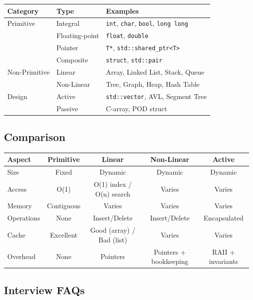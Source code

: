 \begin{center}
\begin{tabular}{lll}
\toprule
Category & Type & Examples \\
\midrule
Primitive & Integral & \texttt{int}, \texttt{char}, \texttt{bool}, \texttt{long long} \\
& Floating-point & \texttt{float}, \texttt{double} \\
& Pointer & \texttt{T*}, \texttt{std::shared\_ptr<T>} \\
& Composite & \texttt{struct}, \texttt{std::pair} \\
\midrule
Non-Primitive & Linear & Array, Linked List, Stack, Queue \\
& Non-Linear & Tree, Graph, Heap, Hash Table \\
\midrule
Design & Active & \texttt{std::vector}, AVL, Segment Tree \\
& Passive & C-array, POD struct \\
\bottomrule
\end{tabular}
\end{center}

\subsection{Comparison}

\begin{center}
\begin{tabular}{lcccc}
\toprule
Aspect & Primitive & Linear & Non-Linear & Active \\
\midrule
Size & Fixed & Dynamic & Dynamic & Dynamic \\
Access & O(1) & O(1) index / O(n) search & Varies & Varies \\
Memory & Contiguous & Varies & Varies & Varies \\
Operations & None & Insert/Delete & Insert/Delete & Encapsulated \\
Cache & Excellent & Good (array) / Bad (list) & Varies & Varies \\
Overhead & None & Pointers & Pointers + bookkeeping & RAII + invariants \\
\bottomrule
\end{tabular}
\end{center}

\subsection{Interview FAQs}

